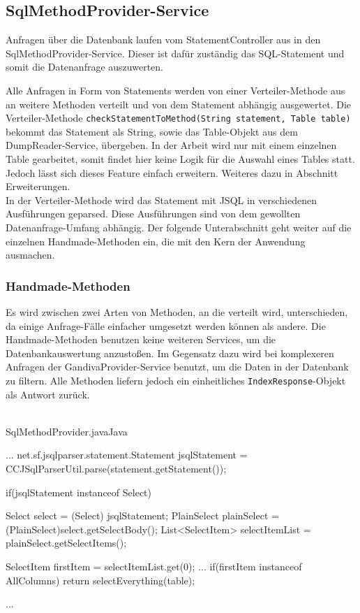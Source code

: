 \subsection{SqlMethodProvider-Service}
\label{SqlMethodProvider-Service}
Anfragen über die Datenbank laufen vom StatementController aus in den \\ SqlMethodProvider-Service. Dieser ist dafür zuständig das SQL-Statement und somit die Datenanfrage auszuwerten.

Alle Anfragen in Form von Statements werden von einer Verteiler-Methode aus an weitere Methoden verteilt und von dem Statement abhängig ausgewertet.
Die Verteiler-Methode \texttt{checkStatementToMethod(String statement, Table table)} bekommt das Statement als String, sowie das Table-Objekt aus dem DumpReader-Service, übergeben. In der Arbeit wird nur mit einem einzelnen Table gearbeitet, somit findet hier keine Logik für die Auswahl eines Tables statt. Jedoch lässt sich dieses Feature einfach erweitern. Weiteres dazu in Abschnitt Erweiterungen.\\

In der Verteiler-Methode wird das Statement mit JSQL in verschiedenen Ausführungen geparsed. Diese Ausführungen sind von dem gewollten Datenanfrage-Umfang abhängig. Der folgende Unterabschnitt geht weiter auf die einzelnen Handmade-Methoden ein, die mit den Kern der Anwendung ausmachen.


\subsubsection{Handmade-Methoden}


Es wird zwischen zwei Arten von Methoden, an die verteilt wird, unterschieden, da einige Anfrage-Fälle einfacher umgesetzt werden können als andere.
Die Handmade-Methoden benutzen keine weiteren Services, um die Datenbankauswertung anzustoßen. Im Gegensatz dazu wird bei komplexeren Anfragen der GandivaProvider-Service benutzt, um die Daten in der Datenbank zu filtern.
Alle Methoden liefern jedoch ein einheitliches \texttt{IndexResponse}-Objekt als Antwort zurück.\\\\

\begin{codeblock}{SqlMethodProvider.java}{Java}
  \begin{javacode}
    ...
net.sf.jsqlparser.statement.Statement jsqlStatement = CCJSqlParserUtil.parse(statement.getStatement()); 

if(jsqlStatement instanceof Select) {

            Select select = (Select) jsqlStatement;
            PlainSelect plainSelect = (PlainSelect)select.getSelectBody();
            List<SelectItem> selectItemList = plainSelect.getSelectItems();

            SelectItem firstItem = selectItemList.get(0);
			...
            if(firstItem instanceof AllColumns){
                return selectEverything(table);
            }
}
    ...
  \end{javacode}
\end{codeblock}


